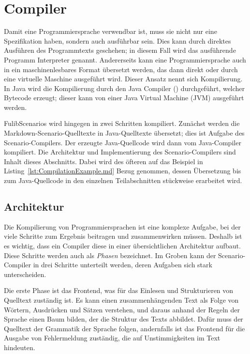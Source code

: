 \section{Compiler}\label{sec:compiler}

Damit eine Programmiersprache verwendbar ist, muss sie nicht nur eine Spezifikation haben, sondern auch ausführbar sein.
Dies kann durch direktes Ausführen des Programmtexts geschehen;
in diesem Fall wird das ausführende Programm Interpreter genannt.
Andererseits kann eine Programmiersprache auch in ein maschinenlesbares Format übersetzt werden,
das dann direkt oder durch eine virtuelle Maschine ausgeführt wird.
Dieser Ansatz nennt sich Kompilierung.
In Java wird die Kompilierung durch den Java Compiler () durchgeführt, welcher Bytecode erzeugt;
dieser kann von einer Java Virtual Machine (JVM) ausgeführt werden.

FulibScenarios wird hingegen in zwei Schritten kompiliert.
Zunächst werden die Markdown-Scenario-Quelltexte in Java-Quelltexte übersetzt;
dies ist Aufgabe des Scenario-Compilers.
Der erzeugte Java-Quellcode wird dann vom Java-Compiler kompiliert.
Die Architektur und Implementierung des Scenario-Compilers sind Inhalt dieses Abschnitts.
Dabei wird des öfteren auf das Beispiel in Listing~\ref{lst:CompilationExample.md} Bezug genommen,
dessen Übersetzung bis zum Java-Quellcode in den einzelnen Teilabschnitten stückweise erarbeitet wird.


\subsection{Architektur}\label{subsec:compiler-architecture}

Die Kompilierung von Programmiersprachen ist eine komplexe Aufgabe,
bei der viele Schritte zum Ergebnis beitragen und zusammenwirken müssen.
Deshalb ist es wichtig, dass ein Compiler diese in einer übersichtlichen Architektur aufbaut.
Diese Schritte werden auch als \emph{Phasen}\cite[4]{dragonbook} bezeichnet.
Im Groben kann der Scenario-Compiler in drei Schritte unterteilt werden,
deren Aufgaben sich stark unterscheiden.

Die erste Phase ist das Frontend, was für das Einlesen und Strukturieren von Quelltext zuständig ist.
Es kann einen zusammenhängenden Text als Folge von Wörtern, Ausdrücken und Sätzen verstehen,
und daraus anhand der Regeln der Sprache einen Baum bilden,
der die Struktur des Texts abbildet.
Dafür muss der Quelltext der Grammatik der Sprache folgen,
andernfalls ist das Frontend für die Ausgabe von Fehlermeldung zuständig,
die auf Unstimmigkeiten im Text hindeuten.

